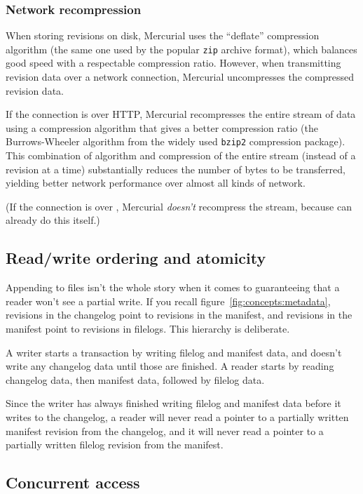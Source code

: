 \subsubsection{Network recompression}

When storing revisions on disk, Mercurial uses the ``deflate''
compression algorithm (the same one used by the popular \texttt{zip}
archive format), which balances good speed with a respectable
compression ratio.  However, when transmitting revision data over a
network connection, Mercurial uncompresses the compressed revision
data.

If the connection is over HTTP, Mercurial recompresses the entire
stream of data using a compression algorithm that gives a better
compression ratio (the Burrows-Wheeler algorithm from the widely used
\texttt{bzip2} compression package).  This combination of algorithm
and compression of the entire stream (instead of a revision at a time)
substantially reduces the number of bytes to be transferred, yielding
better network performance over almost all kinds of network.

(If the connection is over , Mercurial \emph{doesn't}
recompress the stream, because  can already do this
itself.)

\subsection{Read/write ordering and atomicity}

Appending to files isn't the whole story when it comes to guaranteeing
that a reader won't see a partial write.  If you recall
figure~\ref{fig:concepts:metadata}, revisions in the changelog point to
revisions in the manifest, and revisions in the manifest point to
revisions in filelogs.  This hierarchy is deliberate.

A writer starts a transaction by writing filelog and manifest data,
and doesn't write any changelog data until those are finished.  A
reader starts by reading changelog data, then manifest data, followed
by filelog data.

Since the writer has always finished writing filelog and manifest data
before it writes to the changelog, a reader will never read a pointer
to a partially written manifest revision from the changelog, and it will
never read a pointer to a partially written filelog revision from the
manifest.

\subsection{Concurrent access}

